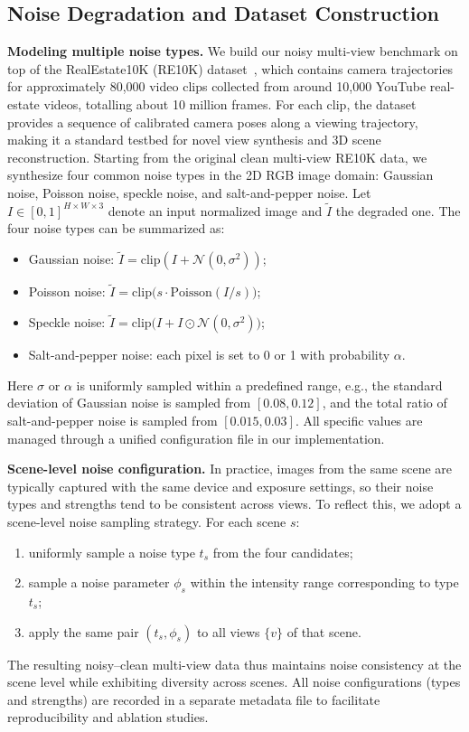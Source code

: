 \subsection{Noise Degradation and Dataset Construction}
\label{subsec:noise_degradation_dataset}

\textbf{Modeling multiple noise types.}
We build our noisy multi-view benchmark on top of the RealEstate10K (RE10K) dataset~\cite{realestate10k}, which contains camera trajectories for approximately 80{,}000 video clips collected from around 10{,}000 YouTube real-estate videos, 
totalling about 10 million frames. For each clip, the dataset provides a sequence of calibrated camera poses along a viewing trajectory, making it a standard testbed for novel view synthesis and 3D scene reconstruction. Starting from the original clean multi-view RE10K data, we synthesize four common noise types in the 2D RGB image domain:
Gaussian noise, Poisson noise, speckle noise, and salt-and-pepper noise. Let
\(
I \in [0,1]^{H\times W \times 3}
\)
denote an input normalized image and \(\tilde{I}\) the degraded one. The four noise types can be summarized as:
\begin{itemize}
    \item Gaussian noise: \(\tilde{I} = \mathrm{clip}(I + \mathcal{N}(0,\sigma^{2}))\);
    \item Poisson noise: \(\tilde{I} = \mathrm{clip}\bigl(s \cdot \mathrm{Poisson}(I/s)\bigr)\);
    \item Speckle noise: \(\tilde{I} = \mathrm{clip}\bigl(I + I \odot \mathcal{N}(0,\sigma^{2})\bigr)\);
    \item Salt-and-pepper noise: each pixel is set to 0 or 1 with probability \(\alpha\).
\end{itemize}
Here \(\sigma\) or \(\alpha\) is uniformly sampled within a predefined range, e.g., the standard deviation of Gaussian noise is sampled from \([0.08, 0.12]\), and the total ratio of salt-and-pepper noise is sampled from \([0.015, 0.03]\). All specific values are managed through a unified configuration file in our implementation.

\noindent \textbf{Scene-level noise configuration.}
In practice, images from the same scene are typically captured with the same device and exposure settings, so their noise types and strengths tend to be consistent across views. To reflect this, we adopt a scene-level noise sampling strategy. For each scene \(s\):
\begin{enumerate}
    \item uniformly sample a noise type \(t_{s}\) from the four candidates;
    \item sample a noise parameter \(\phi_{s}\) within the intensity range corresponding to type \(t_{s}\);
    \item apply the same pair \((t_{s}, \phi_{s})\) to all views \(\{v\}\) of that scene.
\end{enumerate}
The resulting noisy--clean multi-view data thus maintains noise consistency at the scene level while exhibiting diversity across scenes. All noise configurations (types and strengths) are recorded in a separate metadata file to facilitate reproducibility and ablation studies.




